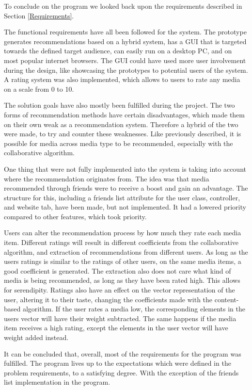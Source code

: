 To conclude on the program we looked back upon the requirements described in Section \ref{Requirements}.

The functional requirements have all been followed for the system. The prototype generates recommendations based on a hybrid system, has a GUI that is targeted towards the defined target audience, can easily run on a desktop PC, and on most popular internet browsers. The GUI could have used more user involvement during the design, like showcasing the prototypes to potential users of the system. A rating system was also implemented, which allows to users to rate any media on a scale from 0 to 10.

The solution goals have also mostly been fulfilled during the project. The two forms of recommendation methods have certain disadvantages, which made them on their own weak as a recommendation system. Therefore a hybrid of the two were made, to try and counter these weaknesses. Like previously described, it is possible for media across media type to be recommended, especially with the collaborative algorithm. 

One thing that were not fully implemented into the system is taking into account where the recommendation originates from. The idea was that media recommended through friends were to receive a boost and gain an advantage. The structure for this, including a friends list attribute for the user class, controller, and website tab, have been made, but not implemented. It had a lowered priority compared to other features, which took priority. 

Users can alter the recommendation process by how much they rate each media item. Different ratings will result in different coefficients from the collaborative algorithm, and extraction of recommendations from different users. As long as the users ratings is similar to the ratings of other users, on the same media items, a good coefficient is generated. The extraction also does not care what kind of media is being recommended, as long as they have been rated high. This allows for serendipity. Ratings also have an effect on the vector representation of the user, altering it to their taste, changing the coefficients made with the content-based algorithm. If the user rates a media low, the corresponding elements in the users vector will have their weight subtracted. The same happens if the media item receives a high rating, except the elements in the user vector will have weight added instead.

It can be concluded that, overall, most of the requirements for the program was fulfilled. The program lives up to the expectations which were defined in the problem requirements, to a satisfying degree. With the exception of the friends list implementation in the program.